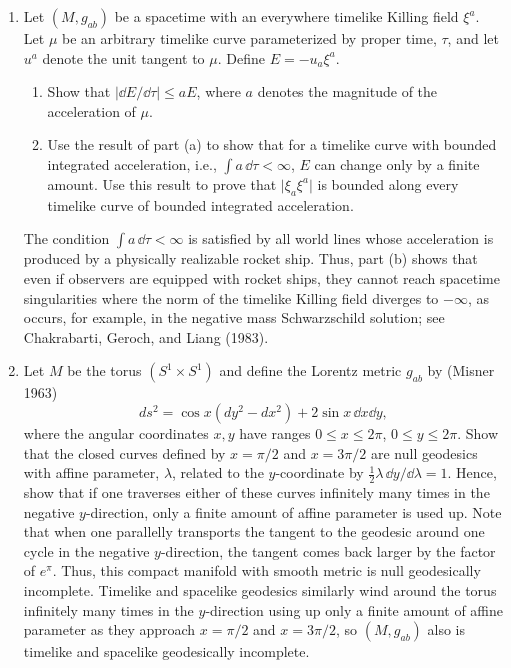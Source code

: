 
\chapterproblems

\begin{enumerate}[label=\arabic*.,leftmargin=*]
\item Let \((M,g_{ab})\) be a spacetime with an everywhere timelike Killing field
\(\xi^a\). Let \(\mu\) be an arbitrary timelike curve parameterized by proper time,
\(\tau\), and let \(u^a\) denote the unit tangent to \(\mu\). Define
\(E=-u_a\xi^a\).
  \begin{enumerate}[label=\alph*),leftmargin=2em]
  \item Show that \(\lvert\dd E/\dd\tau\rvert\leq aE\), where \(a\) denotes the
  magnitude of the acceleration of \(\mu\).

  \item Use the result of part (a) to show that for a timelike curve with bounded
  integrated acceleration, i.e., \(\int a\,\dd\tau<\infty\), \(E\) can change only by
  a finite amount. Use this result to prove that \(\lvert\xi_a\xi^a\rvert\) is bounded
  along every timelike curve of bounded integrated acceleration.
  \end{enumerate}

The condition \(\int a\,\dd\tau<\infty\) is satisfied by all world lines whose
acceleration is produced by a physically realizable rocket ship. Thus, part (b) shows
that even if observers are equipped with rocket ships, they cannot reach spacetime
singularities where the norm of the timelike Killing field diverges to \(-\infty\), as
occurs, for example, in the negative mass Schwarzschild solution; see Chakrabarti,
Geroch, and Liang (1983).

\item Let \(M\) be the torus \((S^1\times S^1)\) and define the Lorentz metric
\(g_{ab}\) by (Misner 1963)
\[
  ds^2=\cos x(dy^2-dx^2)+2\sin x\,\dd x\dd y ,
\]
where the angular coordinates \(x,y\) have ranges \(0\leq x\leq2\pi\),
\(0\leq y\leq2\pi\). Show that the closed curves defined by \(x=\pi/2\) and
\(x=3\pi/2\) are null geodesics with affine parameter, \(\lambda\), related to the
\(y\)-coordinate by \(\tfrac12\lambda\,\dd y/\dd\lambda=1\). Hence, show that if
one traverses either of these curves infinitely many times in the negative
\(y\)-direction, only a finite amount of affine parameter is used up. Note that when
one parallelly transports the tangent to the geodesic around one cycle in the negative
\(y\)-direction, the tangent comes back larger by the factor of \(e^\pi\). Thus, this
compact manifold with smooth metric is null geodesically incomplete. Timelike and
spacelike geodesics similarly wind around the torus infinitely many times in the
\(y\)-direction using up only a finite amount of affine parameter as they approach
\(x=\pi/2\) and \(x=3\pi/2\), so \((M,g_{ab})\) also is timelike and spacelike
geodesically incomplete.


\end{enumerate}
